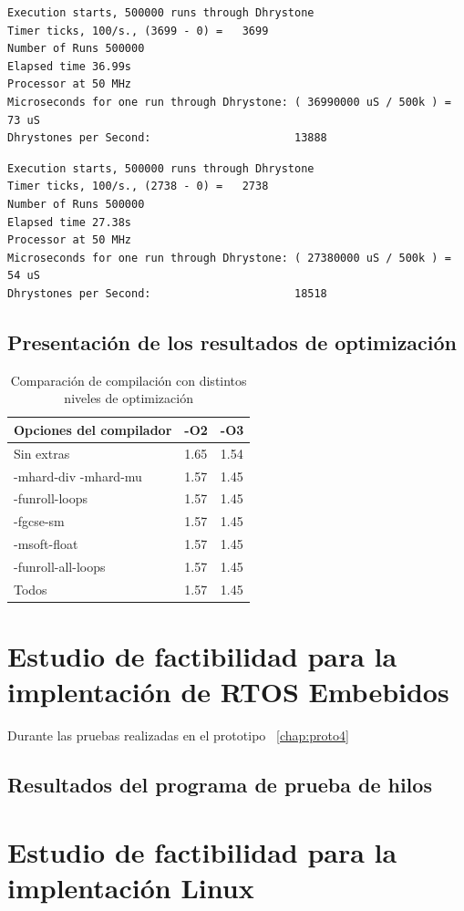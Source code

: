 \begin{lstlisting}[frame=single,caption={Optimización nivel -O2},label={lst:salidas},breaklines]
Execution starts, 500000 runs through Dhrystone
Timer ticks, 100/s., (3699 - 0) =	3699
Number of Runs 500000
Elapsed time 36.99s
Processor at 50 MHz
Microseconds for one run through Dhrystone: ( 36990000 uS / 500k ) = 73 uS
Dhrystones per Second:                      13888 
\end{lstlisting}

\begin{lstlisting}[frame=single,caption={Optimización nivel -O3},label={lst:salidas},breaklines]
Execution starts, 500000 runs through Dhrystone
Timer ticks, 100/s., (2738 - 0) =	2738
Number of Runs 500000
Elapsed time 27.38s
Processor at 50 MHz
Microseconds for one run through Dhrystone: ( 27380000 uS / 500k ) = 54 uS
Dhrystones per Second:                      18518 
\end{lstlisting}


	\subsection {Presentación de los resultados de optimización} 
\begin{table}[h!]
\begin{center}
\begin{tabular}{ |l |l| l|}
\hline
\rowcolor[gray]{0.8} Opciones del compilador&-O2&-O3 \\
\hline
Sin extras 					&1.65 			&1.54\\
\hline
-mhard-div -mhard-mu 		& 1.57			&1.45 \\
\hline
-funroll-loops			 	& 1.57			& 1.45 \\
\hline
-fgcse-sm					& 1.57			& 1.45 \\
\hline
-msoft-float 				& 1.57			&1.45  \\
\hline
-funroll-all-loops	 		& 1.57			& 1.45 \\
\hline
Todos	 					& 1.57			& 1.45 \\
\hline
\end{tabular}
\end{center}
\caption{Comparación de compilación con distintos niveles de optimización}
\end{table}

	\section{Estudio de factibilidad para la implentación de RTOS Embebidos}
	Durante las pruebas realizadas en el prototipo ~\ref{chap:proto4}	

	
		\subsection{Resultados del programa de prueba de hilos}
		
			
		
	
	\section{Estudio de factibilidad para la implentación Linux}
	
	
	 